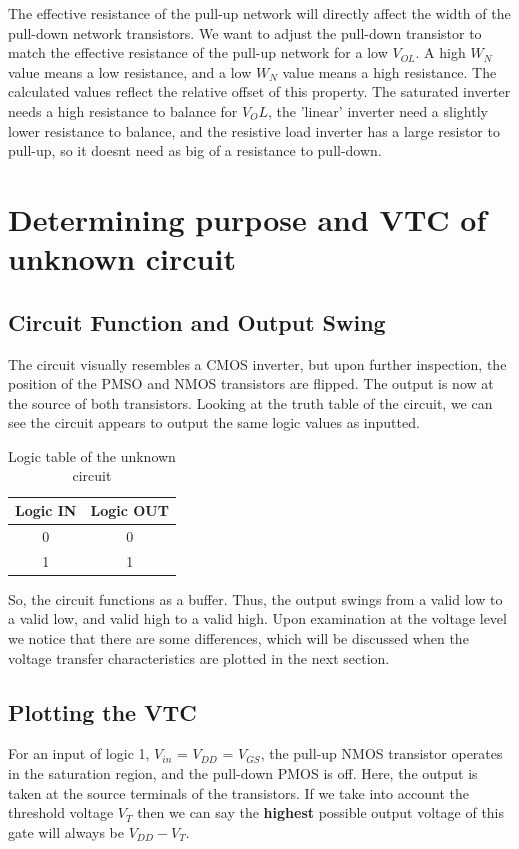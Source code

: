 \documentclass[12pt]{article}
\begin{document}
The effective resistance of the pull-up network will directly affect the width of the pull-down network transistors. 
We want to adjust the pull-down transistor to match the effective resistance of the pull-up network for a low $V_{OL}$. A high $W_N$ value means a low resistance,
and a low $W_N$ value means a high resistance. The calculated values reflect the relative offset of this property. The saturated inverter needs a high resistance
to balance for $V_OL$, the 'linear' inverter need a slightly lower resistance to balance, and the resistive load inverter has a large resistor to pull-up, so it 
doesnt need as big of a resistance to pull-down.


\pagebreak

\section{Determining purpose and VTC of unknown circuit}
\subsection{Circuit Function and Output Swing}
The circuit visually resembles a CMOS inverter, but upon further inspection, the position of the PMSO and NMOS transistors are flipped.
The output is now at the source of both transistors. Looking at the truth table of the circuit, we can see the circuit appears to output the same
logic values as inputted.
\begin{table} [H]
    \centering
    \begin{tabular} {c|c}
        Logic IN & Logic OUT \\
        \hline
        0 & 0\\
        1 & 1\\
    \end{tabular}
    \caption{Logic table of the unknown circuit}
\end{table}
So, the circuit functions as a buffer. Thus, the output swings from a valid low to a valid low, and valid high to a valid high. 
Upon examination at the voltage level we notice that there are some differences, which will be discussed when
the voltage transfer characteristics are plotted in the next section.

\subsection{Plotting the VTC}
For an input of logic 1, $V_{in}$ = $V_{DD}$ = $V_{GS}$, the pull-up NMOS transistor operates in the saturation region, and the pull-down PMOS is off.
Here, the output is taken at the source terminals of the transistors. If we take into account the threshold voltage $V_T$ then we can say the \textbf{highest}
possible output voltage of this gate will always be $V_{DD} - V_T$. 
\end{document}
